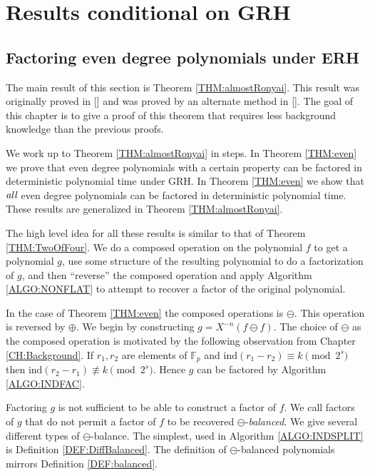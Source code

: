 \documentclass{article}
\let\chapter\section
\theoremstyle{plain}
\theoremstyle{definition}
\def\Fp {{ \mathbb{F} _ {p} }}
\def\ind {{ \mathrm{ind} }}
\begin{document}
%
%
\newpage		
\chapter{Results conditional on GRH}
\label{CH:ERH}
		
		\subsection{Factoring even degree polynomials under ERH}
    The main result of this section is Theorem \ref{THM:almostRonyai}. This result was originally proved in [] and was proved by an alternate method in []. The goal of this chapter is to give a proof of this theorem that requires less background knowledge than the previous proofs. 
			
	  We work up to Theorem \ref{THM:almostRonyai} in steps. In Theorem \ref{THM:even} we prove that even degree polynomials with a certain property can be factored in deterministic polynomial time under GRH. In Theorem \ref{THM:even} we show that $\emph{all}$ even degree polynomials can be factored in deterministic polynomial time. These results are generalized in Theorem \ref{THM:almostRonyai}. 
		
		The high level idea for all these results is similar to that of Theorem \ref{THM:TwoOfFour}. We do a composed operation on the polynomial $f$ to get a polynomial $g$, use some structure of the resulting polynomial to do a factorization of $g$, and then ``reverse'' the composed operation and apply Algorithm \ref{ALGO:NONFLAT} to attempt to recover a factor of the original polynomial.
			
		In the case of Theorem \ref{THM:even} the composed operations is $\ominus$. This operation is reversed by $\oplus$. We begin by constructing $g=X^{-n}(f \ominus f)$. The choice of $\ominus$ as the composed operation is motivated by the following observation from Chapter \ref{CH:Background}. If $r_1,r_2$ are elements of $\Fp$ and $\ind(r_1-r_2) \equiv k \pmod {2^s}$ then $\ind(r_2-r_1) \not\equiv k \pmod {2^s}$. Hence $g$ can be factored by Algorithm \ref{ALGO:INDFAC}.
				
		Factoring $g$ is not sufficient to be able to construct a factor of $f$. We call factors of $g$ that do not permit a factor of $f$ to be recovered $\ominus$-\emph{balanced}. We give several different types of $\ominus$-balance. The simplest, used in Algorithm \ref{ALGO:INDSPLIT} is Definition \ref{DEF:DiffBalanced}. The definition of $\ominus$-balanced polynomials mirrors Definition \ref{DEF:balanced}.
		
\end{document}
